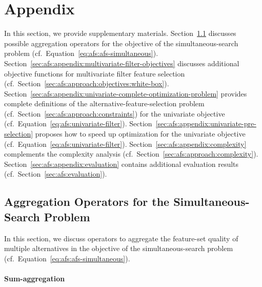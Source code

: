 \documentclass{article}
\theoremstyle{definition}
\begin{document}
\appendix

\section{Appendix}
\label{sec:afs:appendix}

In this section, we provide supplementary materials.
Section~\ref{sec:afs:appendix:simultaneous-objective-aggregation} discusses possible aggregation operators for the objective of the simultaneous-search problem (cf.~Equation~\ref{eq:afs:afs-simultaneous}).
Section~\ref{sec:afs:appendix:multivariate-filter-objectives} discusses additional objective functions for multivariate filter feature selection (cf.~Section~\ref{sec:afs:approach:objectives:white-box}).
Section~\ref{sec:afs:appendix:univariate-complete-optimization-problem} provides complete definitions of the alternative-feature-selection problem (cf.~Section~\ref{sec:afs:approach:constraints}) for the univariate objective (cf.~Equation~\ref{eq:afs:univariate-filter}).
Section~\ref{sec:afs:appendix:univariate-pre-selection} proposes how to speed up optimization for the univariate objective (cf.~Equation~\ref{eq:afs:univariate-filter}).
Section~\ref{sec:afs:appendix:complexity} complements the complexity analysis (cf.~Section~\ref{sec:afs:approach:complexity}).
Section~\ref{sec:afs:appendix:evaluation} contains additional evaluation results (cf.~Section~\ref{sec:afs:evaluation}).

\subsection{Aggregation Operators for the Simultaneous-Search Problem}
\label{sec:afs:appendix:simultaneous-objective-aggregation}

In this section, we discuss operators to aggregate the feature-set quality of multiple alternatives in the objective of the simultaneous-search problem (cf.~Equation~\ref{eq:afs:afs-simultaneous}).

\paragraph{Sum-aggregation}
\end{document}
